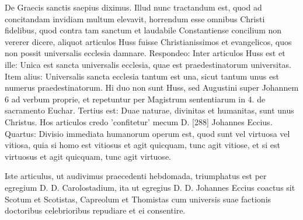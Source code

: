 De Graecis sanctis saepius diximus. Illud nunc tractandum est, quod ad concitandam invidiam multum elevavit, horrendum esse omnibus Christi fidelibus, quod contra tam sanctum et laudabile Constantiense concilium non vererer dicere, aliquot articulos Huss fuisse Christianissimos et evangelicos, quos non possit universalis ecclesia damnare. Respondeo: Inter articulos Huss est et ille: Unica est sancta universalis ecclesia, quae est praedestinatorum universitas. Item alius: Universalis sancta ecclesia tantum est una, sicut tantum unus est numerus praedestinatorum. Hi duo non sunt Huss, sed Augustini super Johannem 6 ad verbum proprie, et repetuntur per Magistrum sententiarum in 4. de sacramento Euchar. Tertius est: Duae naturae, divinitas et humanitas, sunt unus Christus. Hos articulos credo 'confitetur' mecum D. [288] Johannes Eccius. Quartus: Divisio immediata humanorum operum est, quod sunt vel virtuosa vel vitiosa, quia si homo est vitiosus et agit quicquam, tunc agit vitiose, et si est virtuosus et agit quicquam, tunc agit virtuose.

Iste articulus, ut audivimus praecedenti hebdomada, triumphatus est per egregium D. D. Carolostadium, ita ut egregius D. D. Johannes Eccius coactus sit Scotum et Scotistas, Capreolum et Thomistas cum universis suae factionis doctoribus celebrioribus repudiare et ei consentire.

